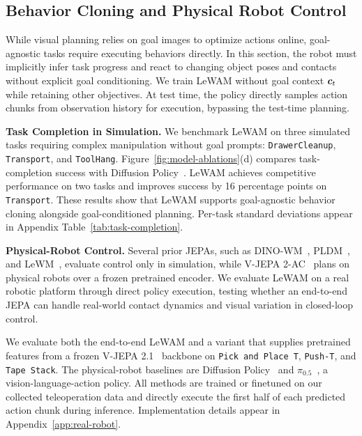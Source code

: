 \documentclass{article} %
\newcommand{\methodname}[1]{\textup{#1}}
\newcommand{\dataset}[1]{\texttt{#1}}
\newcommand{\method}{\methodname{LeWAM}}
\newcommand{\lead}[1]{\textbf{#1}}
\begin{document}
\subsection{Behavior Cloning and Physical Robot Control}
\label{sec:behavior-cloning-robot-control}
While visual planning relies on goal images to optimize actions online, goal-agnostic tasks require executing behaviors directly. In this section, the robot must implicitly infer task progress and react to changing object poses and contacts without explicit goal conditioning. We train \method{} without goal context ${\bm{c}}_t$ while retaining other objectives. At test time, the policy directly samples action chunks from observation history for execution, bypassing the test-time planning.

\label{sec:task-completion-results}
\lead{Task Completion in Simulation.} We benchmark \method{} on three simulated tasks requiring complex manipulation without goal prompts: \dataset{DrawerCleanup}, \dataset{Transport}, and \dataset{ToolHang}. Figure~\ref{fig:model-ablations}(d) compares task-completion success with \methodname{Diffusion Policy}~\citep{chi2023diffusionpolicy}. \method{} achieves competitive performance on two tasks and improves success by 16 percentage points on \dataset{Transport}. These results show that \method{} supports goal-agnostic behavior cloning alongside goal-conditioned planning. Per-task standard deviations appear in Appendix Table~\ref{tab:task-completion}.

\lead{Physical-Robot Control.} Several prior JEPAs, such as \methodname{DINO-WM}~\citep{zhou2024dinowm}, \methodname{PLDM}~\citep{sobal2025pldm}, and \methodname{LeWM}~\citep{maes2026lewm}, evaluate control only in simulation, while \methodname{V-JEPA 2-AC}~\citep{assran2025vjepa2} plans on physical robots over a frozen pretrained encoder. We evaluate LeWAM on a real robotic platform through direct policy execution, testing whether an end-to-end JEPA can handle real-world contact dynamics and visual variation in closed-loop control.

We evaluate both the end-to-end LeWAM and a variant that supplies pretrained
features from a frozen \methodname{V-JEPA 2.1}~\citep{murlabadia2026vjepa21}
backbone on \dataset{Pick and Place T}, \dataset{Push-T}, and \dataset{Tape Stack}. The physical-robot
baselines are \methodname{Diffusion Policy}~\citep{chi2023diffusionpolicy} and $\pi_{0.5}$~\citep{physicalintelligence2025pi05},
a vision-language-action policy. All methods are trained or finetuned on our collected teleoperation data and directly execute the first half of each predicted
action chunk during inference. Implementation details appear in Appendix~\ref{app:real-robot}.
\end{document}
